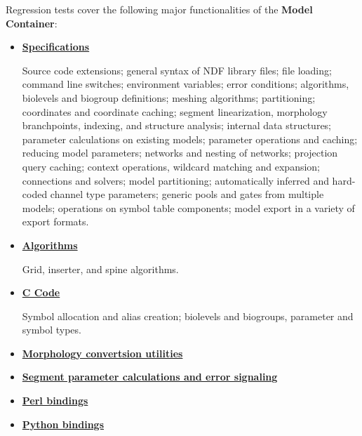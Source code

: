 \documentclass[12pt]{article}
\begin{document}
Regression tests cover the following major functionalities of the {\bf Model\,Container}:
\begin{itemize}

\item[]\href{http://www.neurospaces.org/neurospaces_project/neurospaces/tests/html/specifications/main.html}{\bf Specifications}

Source code extensions; general syntax of NDF library files; file loading; command line switches; environment variables; error conditions;  algorithms, biolevels and biogroup definitions; meshing algorithms; partitioning; coordinates and coordinate caching;  segment linearization, morphology branchpoints, indexing, and structure analysis; internal data structures; parameter calculations on existing models; parameter operations and caching; reducing model parameters; networks and nesting of networks; projection query caching; context operations, wildcard matching and expansion; connections and solvers; model partitioning; automatically inferred and hard-coded channel type parameters;  generic pools and gates from multiple models; operations on symbol table components; model export in a variety of export formats.

\item[]\href{http://www.neurospaces.org/neurospaces_project/neurospaces/tests/html/specifications/algorithms/main.html}{\bf Algorithms}

Grid, inserter, and spine algorithms.

\item[]\href{http://www.neurospaces.org/neurospaces_project/neurospaces/tests/html/specifications/code/main.html}{\bf C Code}

Symbol allocation and alias creation; biolevels and biogroups, parameter and symbol types. 

\item[]\href{http://www.neurospaces.org/neurospaces_project/neurospaces/tests/html/specifications/convertors/main.html}{\bf Morphology convertsion utilities}

\item[]\href{http://www.neurospaces.org/neurospaces_project/neurospaces/tests/html/specifications/parameters/main.html}{\bf Segment parameter calculations and error signaling}

\item[]\href{http://www.neurospaces.org/neurospaces_project/neurospaces/tests/html/specifications/perl/main.html}{\bf Perl bindings}

\item[]\href{http://www.neurospaces.org/neurospaces_project/neurospaces/tests/html/specifications/python/main.html}{\bf Python bindings}

\end{itemize}
\end{document}
